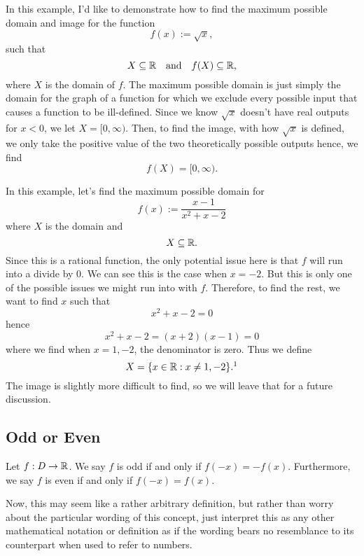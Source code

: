 \begin{ex}
	In this example, I'd like to demonstrate how to find the maximum possible domain and image for the function
	$$f(x):=\sqrt{x},$$ 
	such that 
	$$X\subseteq\mathbb{R} \quad\text{and}\quad f(X)\subseteq \mathbb{R},$$
	where $X$ is the domain of $f$.
	The maximum possible domain is just simply the domain for the graph of a function for which we exclude every possible input that causes a function to be ill-defined. 
	Since we know $\sqrt{x}$ doesn't have real outputs for $x<0$, we let $X=[0,\infty)$. 
	Then, to find the image, with how $\sqrt{x}$ is defined, we only take the positive value of the two theoretically possible outputs hence, we find
	$$f(X)=[0,\infty).$$
\end{ex}
\begin{ex}
	In this example, let's find the maximum possible domain for 
	$$f(x):=\frac{x-1}{x^2+x-2}$$
	where $X$ is the domain and
	$$X\subseteq\mathbb{R}.$$
	Since this is a rational function, the only potential issue here is that $f$ will run into a divide by 0. We can see this is the case when $x=-2$. But this is only one of the possible issues we might run into with $f$. Therefore, to find the rest, we want to find $x$ such that
	$$x^2+x-2=0$$
	hence
	$$x^2+x-2=(x+2)(x-1)=0$$
	where we find when $x=1,-2$, the denominator is zero.
	Thus we define 
	$$X=\{x\in\real:x\neq1,-2\}.\footnotemark$$
	The image is slightly more difficult to find, so we will leave that for a future discussion.
\end{ex}


\subsection{Odd or Even}
\begin{define}
	Let $f: D \to \mathbb{R}$\footnotemark. We say $f$ is odd if and only if $f(-x)=-f(x)$.
	Furthermore, we say $f$ is even if and only if $f(-x)=f(x)$.	
\end{define}

Now, this may seem like a rather arbitrary definition, but rather than worry about the particular wording of this concept, just interpret this as any other mathematical notation or definition as if the wording bears no resemblance to its counterpart when used to refer to numbers. 

